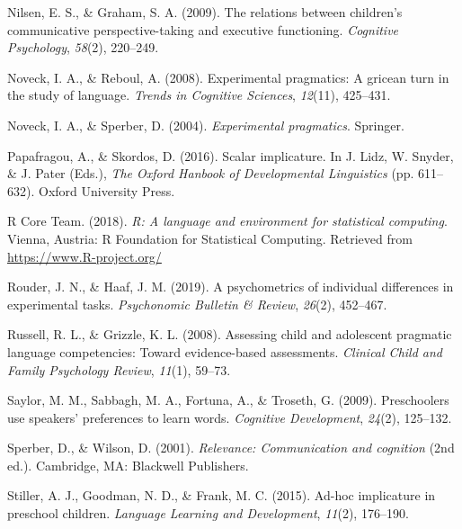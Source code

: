 \documentclass[
  english,
  man,floatsintext]{apa6}
\newlength{\cslhangindent}
\newlength{\cslentryspacingunit} %
\newenvironment{CSLReferences}[2] %
 {%
  \setlength{\parindent}{0pt}
  \ifodd #1
  \let\oldpar\par
  \def\par{\hangindent=\cslhangindent\oldpar}
  \fi
  \setlength{\parskip}{#2\cslentryspacingunit}
 }%
 {}
\begin{document}
\begin{CSLReferences}{1}{0}
\leavevmode{}%
Nilsen, E. S., \& Graham, S. A. (2009). The relations between children's communicative perspective-taking and executive functioning. \emph{Cognitive Psychology}, \emph{58}(2), 220--249.

\leavevmode{}%
Noveck, I. A., \& Reboul, A. (2008). Experimental pragmatics: A gricean turn in the study of language. \emph{Trends in Cognitive Sciences}, \emph{12}(11), 425--431.

\leavevmode{}%
Noveck, I. A., \& Sperber, D. (2004). \emph{Experimental pragmatics}. Springer.

\leavevmode{}%
Papafragou, A., \& Skordos, D. (2016). Scalar implicature. In J. Lidz, W. Snyder, \& J. Pater (Eds.), \emph{The Oxford Hanbook of Developmental Linguistics} (pp. 611--632). Oxford University Press.

\leavevmode{}%
R Core Team. (2018). \emph{R: A language and environment for statistical computing}. Vienna, Austria: R Foundation for Statistical Computing. Retrieved from \url{https://www.R-project.org/}

\leavevmode{}%
Rouder, J. N., \& Haaf, J. M. (2019). A psychometrics of individual differences in experimental tasks. \emph{Psychonomic Bulletin \& Review}, \emph{26}(2), 452--467.

\leavevmode{}%
Russell, R. L., \& Grizzle, K. L. (2008). Assessing child and adolescent pragmatic language competencies: Toward evidence-based assessments. \emph{Clinical Child and Family Psychology Review}, \emph{11}(1), 59--73.

\leavevmode{}%
Saylor, M. M., Sabbagh, M. A., Fortuna, A., \& Troseth, G. (2009). Preschoolers use speakers' preferences to learn words. \emph{Cognitive Development}, \emph{24}(2), 125--132.

\leavevmode{}%
Sperber, D., \& Wilson, D. (2001). \emph{Relevance: Communication and cognition} (2nd ed.). Cambridge, MA: Blackwell Publishers.

\leavevmode{}%
Stiller, A. J., Goodman, N. D., \& Frank, M. C. (2015). Ad-hoc implicature in preschool children. \emph{Language Learning and Development}, \emph{11}(2), 176--190.


\end{CSLReferences}
\end{document}
